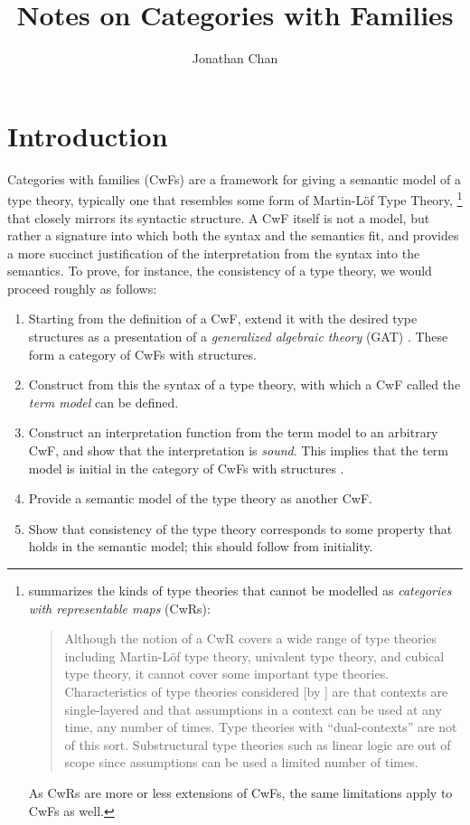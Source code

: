 \documentclass{article}
\title{Notes on Categories with Families}
\author{Jonathan Chan}
\date{}
\renewcommand{\_}{\textrm{\textscale{.5}{\textunderscore}}}
\newlength{\punctwidth}
\newcommand{\punctstack}[1]{#1%
  \settowidth{\punctwidth}{#1}%
  \hspace*{-\the\punctwidth}%
}
\theoremstyle{definition}
\theoremstyle{plain}
\begin{document}
\maketitle

\tableofcontents
\clearpage

\section{Introduction}

Categories with families (CwFs) \citep{itt} are a framework for giving a semantic model of a type theory,
typically one that resembles some form of Martin-L\"of Type Theory\punctstack{,}%
\footnote{\citet{actt} summarizes the kinds of type theories that cannot be modelled as \emph{categories with representable maps} (CwRs):
\begin{quote}
    Although the notion of a CwR covers a wide range of type theories including Martin-L\"of type theory,
    univalent type theory, and cubical type theory, it cannot cover some important type theories.
    Characteristics of type theories considered [by \citet{actt}] are that contexts are single-layered
    and that assumptions in a context can be used at any time, any number of times.
    Type theories with “dual-contexts” are not of this sort.
    Substructural type theories such as linear logic are out of scope since assumptions can be used a limited number of times.
\end{quote}
As CwRs are more or less extensions of CwFs, the same limitations apply to CwFs as well.}
that closely mirrors its syntactic structure.
A CwF itself is not a model,
but rather a signature into which both the syntax and the semantics fit,
and provides a more succinct justification of the interpretation from the syntax into the semantics.
To prove, for instance, the consistency of a type theory,
we would proceed roughly as follows:

\begin{enumerate}
    \item Starting from the definition of a CwF,
    extend it with the desired type structures as a presentation of
    a \emph{generalized algebraic theory} (GAT) \citep{gat}.
    These form a category of CwFs with structures.
    \item Construct from this the syntax of a type theory,
    with which a CwF called the \emph{term model} can be defined.
    \item Construct an interpretation function from the term model to an arbitrary CwF,
    and show that the interpretation is \emph{sound}.
    This implies that the term model is initial in the category of CwFs with structures \citep{gatcwf}.
    \item Provide a semantic model of the type theory as another CwF.
    \item Show that consistency of the type theory corresponds to some property that holds in the semantic model;
    this should follow from initiality.
\end{enumerate}
\end{document}

